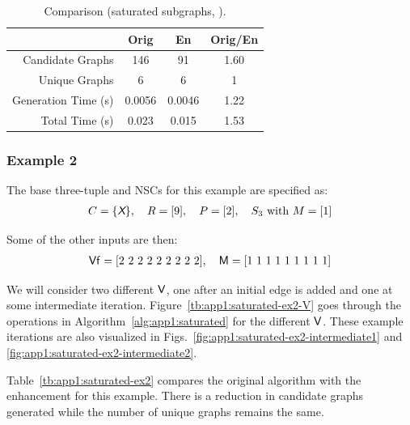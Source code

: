 \begin{table}[!ht]
\centering
\caption{Comparison (saturated subgraphs, ).\label{tb:app1:saturated-ex1}}
\begin{tabular}{r | c | c | c}
\hline \hline
& Orig & En & Orig/En \\
\hline
Candidate Graphs & 146 & 91 & 1.60 \\ 
Unique Graphs & 6 & 6 & 1 \\
Generation Time (s) & 0.0056  & 0.0046 & 1.22 \\
Total Time (s) & 0.023  & 0.015 & 1.53 \\
\hline \hline
\end{tabular}
\end{table}

\subsubsection{Example 2\label{sec:app1:saturated-ex2}}

The base three-tuple and NSCs for this example are specified as:
\begin{align}
C = \{ \textsl{\textsf{X}} \}, \quad R = [9], \quad P = [2], \quad S_3 \text{ with } M = [1]
\end{align}

\noindent Some of the other inputs are then:
\begin{align}
\xvar{Vf} = [2\ 2\ 2\ 2\ 2\ 2\ 2\ 2\ 2], \quad \xvar{M} = [1\ 1\ 1\ 1\ 1\ 1\ 1\ 1\ 1]
\end{align}

\noindent We will consider two different $\textup{\textsf{V}}$, one after an initial edge is added and one at some intermediate iteration. Figure~\ref{tb:app1:saturated-ex2-V} goes through the operations in Algorithm~\ref{alg:app1:saturated} for the different $\textup{\textsf{V}}$. These example iterations are also visualized in Figs.~\ref{fig:app1:saturated-ex2-intermediate1} and \ref{fig:app1:saturated-ex2-intermediate2}.

Table~\ref{tb:app1:saturated-ex2} compares the original algorithm with the enhancement for this example. There is a reduction in candidate graphs generated while the number of unique graphs remains the same.

